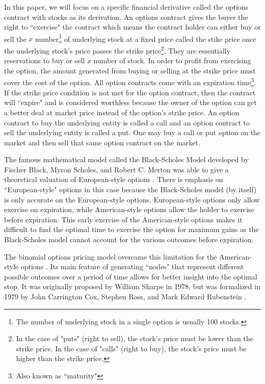\documentclass[12pt, letterpaper]{article}\usepackage{float}
\begin{document}
\medskip

In this paper, we will focus on a specific financial derivative called the options contract with stocks as its derivation.
An options contract gives the buyer the right to ``exercise" the contract which means the contract holder can either buy or sell the ${x}$ number\footnote{The number of underlying stock in a single option is usually 100 stocks.} of underlying stock at a fixed price called the stike price once the underlying stock's price passes the strike price\footnote{In the case of "puts" (right to sell), the stock's price must be lower than the strike price. In the case of "calls" (right to buy), the stock's price must be higher than the strike price. }.
They are essentially reservations to buy or sell ${x}$ number of stock.
In order to profit from exercising the option, the amount generated from buying or selling at the strike price must cover the cost of the option.
All option contracts come with an expiration time\footnote{Also known as ``maturity"}.
If the strike price condition is not met for the option contract, then the contract will ``expire" and is considered worthless because the owner of the option can get a better deal at market price instead of the option's strike price.
An option contract to buy the underlying entity is called a call and an option contract to sell the underlying entity is called a put.
One may buy a call or put option on the market and then sell that same option contract on the market.

\medskip

The famous mathematical model called the Black-Scholes Model developed by Fischer Black, Myron Scholes, and Robert C. Merton was able to give a theoretical valuation of European-style options \cite{blackscholesmodelwikipedia}.
There is emphasis on ``European-style" options in this case because the Black-Scholes model (by itself) is only accurate on the European-style options.
European-style options only allow exercise on expiration, while American-style options allow the holder to exercise before expiration.
This early exercise of the American-style options makes it difficult to find the optimal time to exercise the option for maximum gains \cite{blackscholesmodelwikipedia} as the Black-Scholes model cannot account for the various outcomes before expiration. 

\medskip

The binomial options pricing model overcame this limitation for the American-style options \cite{bopmwikipedia}.
Its main feature of generating ``nodes" that represent different possible outcomes over a period of time allows for better insight into the optimal stop.
It was originally proposed by William Sharpe in 1978, but was formalized in 1979 by John Carrington Cox, Stephen Ross, and Mark Edward Rubenstein \cite{bopmwikipedia}.
\end{document}
